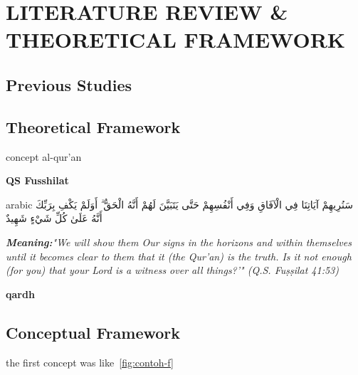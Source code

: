 \chapter{LITERATURE REVIEW \& THEORETICAL FRAMEWORK}
	\section{Previous Studies}
	
	\begin{secenumerate}
		\item \lipsum[1]
		\item \lipsum[1]
		\item \lipsum[1]
	\end{secenumerate}

	\section{Theoretical Framework}
	\begin{secenumerate}
		\item concept al-qur'an
		\begin{secenumerate}
			\item \textbf{QS Fusshilat}
			\begin{otherlanguage*}{arabic}
				\noindent
				سَنُرِيهِمْ آيَاتِنَا فِي الْآفَاقِ وَفِي أَنْفُسِهِمْ حَتَّى يَتَبَيَّنَ لَهُمْ أَنَّهُ الْحَقُّ ۗ أَوَلَمْ يَكْفِ بِرَبِّكَ أَنَّهُ عَلَىٰ كُلِّ شَيْءٍ شَهِيدٌ
			\end{otherlanguage*}
			\vspace{0.5cm}
			
			\textit{\textbf{Meaning:}"We will show them Our signs in the horizons and within themselves until it becomes clear to them that it (the Qur'an) is the truth. Is it not enough (for you) that your Lord is a witness over all things?'" (Q.S. Fuṣṣilat 41:53)}\\
			
			\lipsum [3]
			
		\end{secenumerate}
		\item \textbf{qardh}
		\lipsum [3]
	\end{secenumerate}
	\section{Conceptual Framework}
	the first concept was like~\ref{fig:contoh-f}
	
